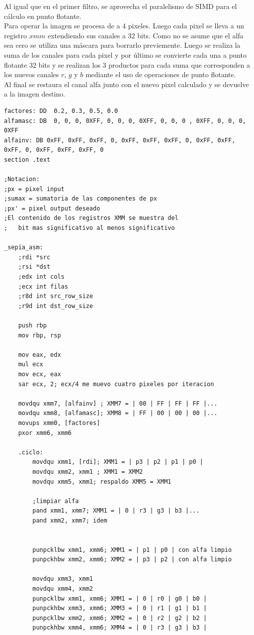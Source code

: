 Al igual que en el primer filtro, se aprovecha el paralelismo de SIMD para el cálculo en punto flotante.\\

Para operar la imagen se procesa de a 4 pixeles. Luego cada pixel se lleva a un registro $xmm$ extendiendo sus canales a 32 bits. Como no se asume que el alfa sea cero se utiliza una máscara para borrarlo previemente. Luego se realiza la suma de los canales para cada pixel y por último se convierte cada una a punto flotante 32 bits y se realizan los 3 productos para cada suma que corresponden a los nuevos canales $r$, $g$ y $b$ mediante el uso de operaciones de punto flotante.\\

Al final se restaura el canal alfa junto con el nuevo pixel calculado y se devuelve a la imagen destino. 

\begin{codesnippet}
\begin{verbatim}
factores: DD  0.2, 0.3, 0.5, 0.0 
alfamasc: DB  0, 0, 0, 0XFF, 0, 0, 0, 0XFF, 0, 0, 0 , 0XFF, 0, 0, 0, 0XFF
alfainv: DB 0xFF, 0xFF, 0xFF, 0, 0xFF, 0xFF, 0xFF, 0, 0xFF, 0xFF, 0xFF, 0, 0xFF, 0xFF, 0xFF, 0    
section .text

;Notacion:
;px = pixel input 
;sumax = sumatoria de las componentes de px
;px' = pixel output deseado
;El contenido de los registros XMM se muestra del 
;	bit mas significativo al menos significativo

_sepia_asm:
	;rdi *src
	;rsi *dst
	;edx int cols
	;ecx int filas
	;r8d int src_row_size
	;r9d int dst_row_size

	push rbp
	mov rbp, rsp
	
	mov eax, edx
	mul ecx
	mov ecx, eax
	sar ecx, 2; ecx/4 me muevo cuatro pixeles por iteracion

 	movdqu xmm7, [alfainv] ; XMM7 = | 00 | FF | FF | FF |...
	movdqu xmm8, [alfamasc]; XMM8 = | FF | 00 | 00 | 00 |...
	movups xmm0, [factores]
	pxor xmm6, xmm6	

	.ciclo:	
		movdqu xmm1, [rdi]; XMM1 = | p3 | p2 | p1 | p0 |
		movdqu xmm2, xmm1 ; XMM1 = XMM2
		movdqu xmm5, xmm1; respaldo XMM5 = XMM1

		;limpiar alfa
		pand xmm1, xmm7; XMM1 = | 0 | r3 | g3 | b3 |...
		pand xmm2, xmm7; idem
			
			
		punpcklbw xmm1, xmm6; XMM1 = | p1 | p0 | con alfa limpio
		punpckhbw xmm2, xmm6; XMM2 = | p3 | p2 | con alfa limpio
		
		movdqu xmm3, xmm1
		movdqu xmm4, xmm2
		punpcklbw xmm1, xmm6; XMM1 = | 0 | r0 | g0 | b0 |
		punpckhbw xmm3, xmm6; XMM3 = | 0 | r1 | g1 | b1 |
		punpcklbw xmm2, xmm6; XMM2 = | 0 | r2 | g2 | b2 |
		punpckhbw xmm4, xmm6; XMM4 = | 0 | r3 | g3 | b3 |

\end{verbatim}
\end{codesnippet}

